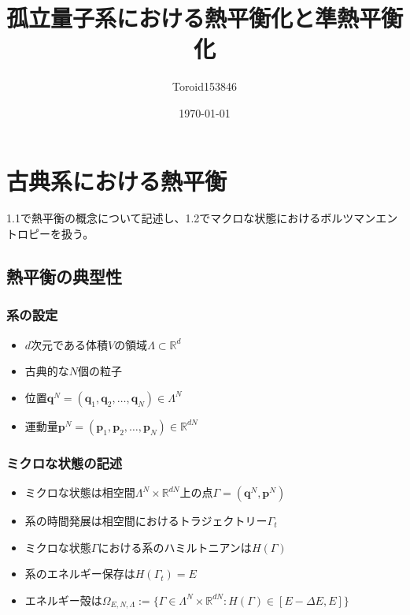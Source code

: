 \documentclass{ltjsarticle}
\title{孤立量子系における熱平衡化と準熱平衡化}
\author{Toroid153846}
\date{\today}
\begin{document}
\maketitle


  \section{古典系における熱平衡}
  1.1で熱平衡の概念について記述し、1.2でマクロな状態におけるボルツマンエントロピーを扱う。
  \subsection{熱平衡の典型性}
  \subsubsection{系の設定}
  \begin{itemize}
    \item $d$次元である体積$V$の領域$\Lambda\subset\mathbb{R}^d$
    \item 古典的な$N$個の粒子
    \item 位置$\bm{q}^N=(\bm{q}_1,\bm{q}_2,\dots,\bm{q}_N)\in\Lambda^N$
    \item 運動量$\bm{p}^N=(\bm{p}_1,\bm{p}_2,\dots,\bm{p}_N)\in\mathbb{R}^{dN}$
  \end{itemize}
  \subsubsection{ミクロな状態の記述}
  \begin{itemize}
  \item ミクロな状態は相空間$\Lambda^N\times\mathbb{R}^{dN}$上の点$\Gamma=(\bm{q}^N,\bm{p}^N)$
  \item 系の時間発展は相空間におけるトラジェクトリー$\Gamma_t$ 
  \item ミクロな状態$\Gamma$における系のハミルトニアンは$H(\Gamma)$
  \item 系のエネルギー保存は$H(\Gamma_t)=E$
  \item エネルギー殻は$\Omega_{E,N,\Lambda}:=\{\Gamma\in\Lambda^N\times\mathbb{R}^{dN}: H(\Gamma)\in[E-\Delta E,E]\}$
  \end{itemize}
\end{document}
